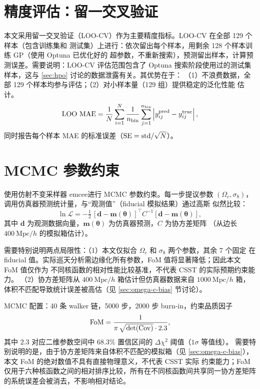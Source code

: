 \section{精度评估：留一交叉验证}\label{sec:loo}

本文采用留一交叉验证（LOO-CV）作为主要精度指标。LOO-CV 在全部 129 个样本（包含训练集和
测试集）上进行：依次留出每个样本，用剩余 128 个样本训练 GP（使用 Optuna 已优化好的
超参数，不重新搜索），预测留出样本，计算预测误差。需要说明：LOO-CV 评估范围包含了 Optuna
搜索阶段使用过的测试集样本，这与 \autoref{sec:hpo} 讨论的数据泄露有关。其优势在于：
（1）不浪费数据，全部 129 个样本均参与评估；（2）对小样本量（129 组）提供稳定的泛化性能
估计。
\begin{equation}\label{eq:loo-mae}
  \mathrm{LOO~MAE}
    = \frac{1}{N} \sum_{i=1}^{N} \frac{1}{n_{\rm bin}}
       \sum_{j=1}^{n_{\rm bin}}
       \left| y_{ij}^{\rm pred} - y_{ij}^{\rm true} \right|,
\end{equation}
同时报告每个样本 MAE 的标准误差（${\rm SE}=\mathrm{std}/\sqrt N$）。

\section{MCMC 参数约束}\label{sec:mcmc}

使用仿射不变采样器 emcee\cite{ForemanMackey2013}进行 MCMC 参数约束。每一步提议参数
$(\Omega_c,\sigma_8)$，调用仿真器预测统计量，与``观测值''（fiducial 模拟结果）通过高斯
似然比较：
\begin{equation}\label{eq:lnL}
  \ln \mathcal{L} = -\tfrac{1}{2}\,
    \left[\symbf{d} - \symbf{m}(\symbf{\theta})\right]^{\!\top}
    C^{-1}
    \left[\symbf{d} - \symbf{m}(\symbf{\theta})\right],
\end{equation}
其中 $\symbf{d}$ 为观测数据向量，$\symbf{m}(\symbf{\theta})$ 为仿真器预测，$C$ 为协方差矩阵
（从边长 $400~\mathrm{Mpc}/h$ 的模拟箱估计）。

需要特别说明两点局限性：（1）本文仅拟合 $\Omega_c$ 和 $\sigma_8$ 两个参数，其余 7 个固定
在 fiducial 值。实际巡天分析需边缘化所有参数，FoM 值将显著降低；因此本文 FoM 值仅作为
不同核函数的相对性能比较基准，不代表 CSST 的实际预期约束能力。
（2）协方差矩阵从 $400~\mathrm{Mpc}/h$ 箱估计但仿真器数据来自 $1000~\mathrm{Mpc}/h$ 箱，
体积不匹配导致统计误差被高估（见 \autoref{sec:omega-c-bias} 节讨论）。

MCMC 配置：40 条 walker 链，5000 步，2000 步 burn-in，约束品质因子
\begin{equation}\label{eq:fom}
  {\rm FoM} = \frac{1}{\pi\, \sqrt{\det(\mathrm{Cov})}\cdot 2.3},
\end{equation}
其中 $2.3$ 对应二维参数空间中 $68.3\%$ 置信区间的 $\Delta\chi^2$ 阈值（$1\sigma$ 等值线）。
需要特别说明的是，由于协方差矩阵来自体积不匹配的模拟箱（见
\autoref{sec:omega-c-bias}），本文 FoM 的绝对数值不具有直接物理意义，不代表 CSST 实际
约束能力；FoM 仅用于六种核函数之间的相对排序比较，所有在不同核函数间共享同一协方差矩阵
的系统误差会被消去，不影响相对结论。

